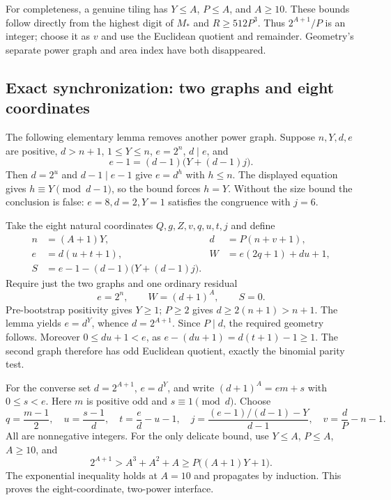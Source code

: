 For completeness, a genuine tiling has $Y\leq A$, $P\leq A$, and
$A\geq10$. These bounds follow directly from the highest digit of $M_*$
and $R\geq512P^3$. Thus $2^{A+1}/P$ is an integer; choose it as $v$
and use the Euclidean quotient and remainder. Geometry's separate power
graph and area index have both disappeared.

\subsection{Exact synchronization: two graphs and eight coordinates}
The following elementary lemma removes another power graph. Suppose
$n,Y,d,e$ are positive, $d>n+1$, $1\leq Y\leq n$, $e=2^n$, $d\mid e$,
and
\[
 e-1=(d-1)\bigl(Y+(d-1)j\bigr).
\]
Then $d=2^u$ and $d-1\mid e-1$ give $e=d^h$ with $h\leq n$.
The displayed equation gives $h\equiv Y\pmod{d-1}$, so the bound forces
$h=Y$. Without the size bound the conclusion is false: $e=8,d=2,Y=1$
satisfies the congruence with $j=6$.

Take the eight natural coordinates $Q,g,Z,v,q,u,t,j$ and define
\[
\begin{aligned}
 n&=(A+1)Y,& d&=P(n+v+1),\\
 e&=d(u+t+1),& W&=e(2q+1)+du+1,\\
 S&=e-1-(d-1)\bigl(Y+(d-1)j\bigr).
\end{aligned}
\]
Require just the two graphs and one ordinary residual
\[
 e=2^n,\qquad W=(d+1)^A,\qquad S=0.
\tag{T2}
\]
Pre-bootstrap positivity gives $Y\geq1$; $P\geq2$ gives
$d\geq2(n+1)>n+1$. The lemma yields $e=d^Y$, whence
$d=2^{A+1}$. Since $P\mid d$, the required geometry follows. Moreover
$0\leq du+1<e$, as $e-(du+1)=d(t+1)-1\geq1$. The second graph
therefore has odd Euclidean quotient, exactly the binomial parity test.

For the converse set $d=2^{A+1}$, $e=d^Y$, and write
$(d+1)^A=em+s$ with $0\leq s<e$. Here $m$ is positive odd and
$s\equiv1\pmod d$. Choose
\[
 q=\frac{m-1}{2},\quad u=\frac{s-1}{d},\quad
 t=\frac ed-u-1,\quad
 j=\frac{(e-1)/(d-1)-Y}{d-1},\quad v=\frac dP-n-1.
\]
All are nonnegative integers. For the only delicate bound, use
$Y\leq A$, $P\leq A$, $A\geq10$, and
\[
 2^{A+1}>A^3+A^2+A\geq P\bigl((A+1)Y+1\bigr).
\]
The exponential inequality holds at $A=10$ and propagates by induction.
This proves the eight-coordinate, two-power interface.

